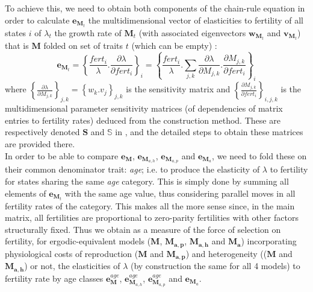 \documentclass[10pt,a4paper]{article}
\begin{document}
To achieve this, we need to obtain both components of the chain-rule equation in order to calculate $\mathbf{e}_{\mathbf{M}_t}$  the multidimensional vector of elasticities to fertility of all states $i$ of $\lambda_t$ the growth rate of $\mathbf{M}_t$ (with associated eigenvectors $\mathbf{w}_{\mathbf{M}_t}$ and $\mathbf{v}_{\mathbf{M}_t}$) that is $\mathbf{M}$ folded on set of traits $t$ (which can be empty) : 
\begin{equation}
\mathbf{e}_{\mathbf{M}_t}=\left\lbrace \frac{fert_{i}}{\lambda }. \frac{\partial \lambda}{\partial fert_{i}}\right\rbrace_i =\left\lbrace \frac{fert_{i}}{\lambda }. \sum_{j,k} \frac{\partial \lambda}{\partial M_{j,k}} . \frac{\partial M_{j,k}}{\partial fert_{i}} \right\rbrace_i    
\end{equation}
where $\left\lbrace \frac{\partial \lambda}{\partial M_{j,k}} \right\rbrace_{j,k}=\left\lbrace w_{k}.v_{j} \right\rbrace_{j,k}$ is the sensitivity matrix \citep{Caswell1989} and $\left\lbrace \frac{\partial M_{j,k}}{\partial fert_{i}} \right\rbrace_{i,j,k}$ is the multidimensional parameter sensitivity matrices (of dependencies of matrix entries to fertility rates) deduced from the construction method.  These are respectively denoted $\mathbf{S}$ and $\mathbb{S}$ in \citep{Coste2017}, and the detailed steps to obtain these matrices are provided there. \\

In order to be able to compare $\mathbf{e}_{\mathbf{M}}$, $\mathbf{e}_{\mathbf{M}_{a,h}}$, $\mathbf{e}_{\mathbf{M}_{a,p}}$ and $\mathbf{e}_{\mathbf{M}_{a}}$, we need to fold these on their common denominator trait: \emph{age}; i.e. to produce the elasticity of $\lambda$ to fertility for states sharing the same \emph{age} category. 
This is simply done by summing all elements of $\mathbf{e}_{\mathbf{M}_{t}}$ with the same age value, thus considering parallel moves in all fertility rates of the category. This makes all the more sense since, in the main matrix, all fertilities are proportional to zero-parity fertilities with other factors structurally fixed. Thus we obtain as a measure of the force of selection on fertility, for ergodic-equivalent models ($\mathbf{M}$, $\mathbf{M_{a,p}}$, $\mathbf{M_{a,h}}$ and $\mathbf{M_{a}}$) incorporating physiological costs of reproduction ($\mathbf{M}$ and $\mathbf{M_{a,p}}$) and heterogeneity (($\mathbf{M}$ and $\mathbf{M_{a,h}}$) or not, the elasticities of $\lambda$ (by construction the same for all 4 models) to fertility rate by age classes $\mathbf{e}_{\mathbf{M}}^{age}$, $\mathbf{e}_{\mathbf{M}_{a,h}}^{age}$, $\mathbf{e}_{\mathbf{M}_{a,p}}^{age}$ and $\mathbf{e}_{\mathbf{M}_{a}}$.\\
\end{document}
